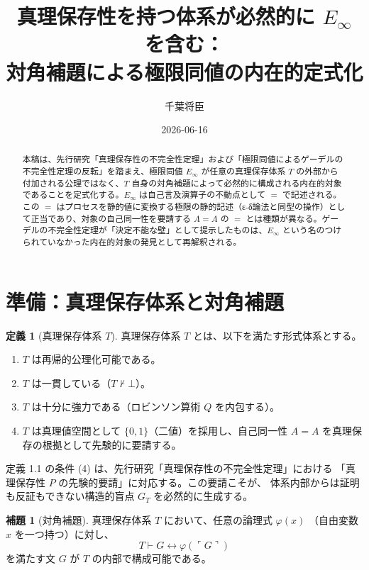 \documentclass[11pt,a4paper]{article}
\theoremstyle{definition}
\newtheorem{definition}{定義}[section]
\newtheorem{lemma}{補題}[section]
\newcommand{\Einfty}{E_\infty}
\begin{document}
\title{真理保存性を持つ体系が必然的に $\Einfty$ を含む：\\
対角補題による極限同値の内在的定式化}
\author{千葉将臣}
\date{2026-06-16}
\maketitle

\begin{abstract}
本稿は、先行研究「真理保存性の不完全性定理」および「極限同値によるゲーデルの不完全性定理の反転」を踏まえ、極限同値 $\Einfty$ が任意の真理保存体系 $T$ の外部から付加される公理ではなく、$T$ 自身の対角補題によって必然的に構成される内在的対象であることを定式化する。$\Einfty$ は自己言及演算子の不動点として $=$ で記述される。この $=$ はプロセスを静的値に変換する極限の静的記述（ε-δ論法と同型の操作）として正当であり、対象の自己同一性を要請する $A = A$ の $=$ とは種類が異なる。ゲーデルの不完全性定理が「決定不能な壁」として提示したものは、$\Einfty$ という名のつけられていなかった内在的対象の発見として再解釈される。
\end{abstract}

\section{準備：真理保存体系と対角補題}

\begin{definition}[真理保存体系 $T$]
真理保存体系 $T$ とは、以下を満たす形式体系とする。
\begin{enumerate}[label=(\arabic*)]
    \item $T$ は再帰的公理化可能である。
    \item $T$ は一貫している（$T \nvdash \bot$）。
    \item $T$ は十分に強力である（ロビンソン算術 $Q$ を内包する）。
    \item $T$ は真理値空間として $\{0, 1\}$（二値）を採用し、自己同一性
          $A = A$ を真理保存の根拠として先験的に要請する。
\end{enumerate}
\end{definition}

定義 1.1 の条件 (4) は、先行研究「真理保存性の不完全性定理」における
「真理保存性 $P$ の先験的要請」に対応する。この要請こそが、
体系内部からは証明も反証もできない構造的盲点 $G_T$ を必然的に生成する。

\begin{lemma}[対角補題]
真理保存体系 $T$ において、任意の論理式 $\varphi(x)$
（自由変数 $x$ を一つ持つ）に対し、
$$T \vdash G \leftrightarrow \varphi(\ulcorner G \urcorner)$$
を満たす文 $G$ が $T$ の内部で構成可能である。
\end{lemma}
\end{document}
